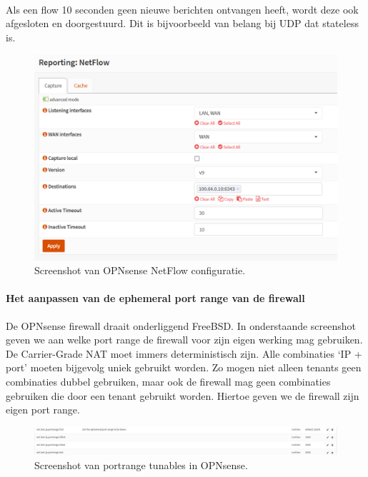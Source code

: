 \paragraph{}
Als een flow 10 seconden geen nieuwe berichten ontvangen heeft, wordt deze ook afgesloten en doorgestuurd. Dit is bijvoorbeeld van belang bij UDP dat stateless is.

\begin{figure}[!htbp]
    \includegraphics[width=\textwidth]{./graphics/opnsense_netflow_conf.PNG}
    \caption[OPNsense NetFlow configuratie]{Screenshot van OPNsense NetFlow configuratie.}
    \label{fig:FirewallNetflow}
\end{figure}

\paragraph{Het aanpassen van de ephemeral port range van de firewall}
De OPNsense firewall draait onderliggend FreeBSD. In onderstaande screenshot geven we aan welke port range de firewall voor zijn eigen werking mag gebruiken. De Carrier-Grade NAT moet immers deterministisch zijn. Alle combinaties ‘IP + port’ moeten bijgevolg uniek gebruikt worden. Zo mogen niet alleen tenants geen combinaties dubbel gebruiken, maar ook de firewall mag geen combinaties gebruiken die door een tenant gebruikt worden. Hiertoe geven we de firewall zijn eigen port range.

\begin{figure}[!htbp]
    \includegraphics[width=\textwidth]{graphics/opnsense_tunables_portrange.PNG}
    \caption[OPNsense tunables portrange]{Screenshot van portrange tunables in OPNsense.}
    \label{fig:FirewallTunables}
\end{figure}

